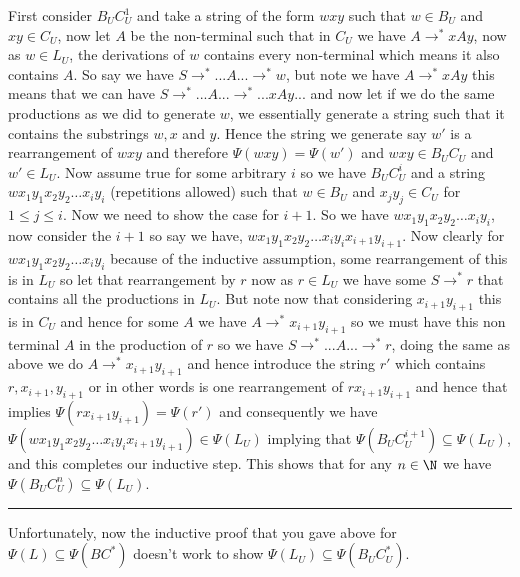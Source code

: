 \documentclass[11pt]{article}
\newenvironment{proof}{{\bf Proof:}}{\hfill\rule{2mm}{2mm}}
\begin{document}
\begin{proof}
  First consider $B_UC^{1}_U$ and take a string of the form $wxy$ such that $w \in B_U$ and $xy \in C_U$, now let $A$ be the non-terminal such that in $C_U$ we have $A \to^{*} xAy$, now as $w \in L_U$, the derivations of $w$ contains every non-terminal which means it also contains $A$. So say we have $S \to^{*} ... A ... \to^{*} w$, but note we have $A \to^{*} xAy$ this means that we can have $S \to^{*} ... A... \to^{*} ... xAy ...$ and now let if we do the same productions as we did to generate $w$, we essentially generate a string such that it contains the substrings $w, x$ and $y$. Hence the string we generate say $w'$ is a rearrangement of $wxy$ and therefore $\Psi(wxy) = \Psi(w')$  and $wxy \in B_UC_U$ and $w' \in L_U$. Now assume true for some arbitrary $i$ so we have $B_UC^{i}_U$ and a string $w x_1y_1 x_2y_{2} \dots x_iy_i$ (repetitions allowed) such that $w \in B_U$ and $x_jy_j \in C_U$ for $1 \le j \le i$.  Now we need to show the case for $i + 1$. So we have $w x_1y_1 x_2y_{2} \dots x_iy_i$, now consider the $i + 1$ so say we have, $w x_1y_1 x_2y_{2} \dots x_iy_i x_{i + 1}y_{i + 1}$. Now clearly for $w x_1y_1 x_2y_{2} \dots x_iy_i$ because of the inductive assumption, some rearrangement of this is in $L_U$ so let that rearrangement by $r$ now as $r \in L_U$ we have some $S \to^{*} r$ that contains all the productions in $L_U$. But note now that considering $x_{i +1 }y_{i + 1}$ this is in $C_U$ and hence for some $A$ we have $A \to^{*} x_{i + 1}y_{i +1}$ so we must have this non terminal $A$ in the production of $r$ so we have $S \to^{*} ... A... \to^{*} r$, doing the same as above we do $A \to^{*} x_{i + 1}y_{i + 1}$ and hence introduce the string $r'$ which contains $r, x_{i +1}, y_{i +1}$ or in other words is one rearrangement of $r x_{i + 1}y_{i + 1}$ and hence that implies $\Psi(r x_{i + 1}y_{i + 1}) = \Psi(r')$ and consequently we have $\Psi (w x_1y_1 x_2y_{2} \dots x_iy_i x_{i + 1}y_{i + 1}) \in \Psi(L_U)$ implying that $\Psi(B_UC^{i + 1}_U) \subseteq \Psi(L_U)$, and this completes our inductive step. This shows that for any $n \in \N$ we have $\Psi(B_UC_U^{n}) \subseteq \Psi(L_U)$.

\end{proof}

\vspace{1em}


Unfortunately, now the inductive proof that you gave above for $\Psi(L) \subseteq \Psi(BC^*)$ doesn't work to show $\Psi(L_U) \subseteq \Psi(B_UC_U^*)$. \hbreak \newline
\end{document}
